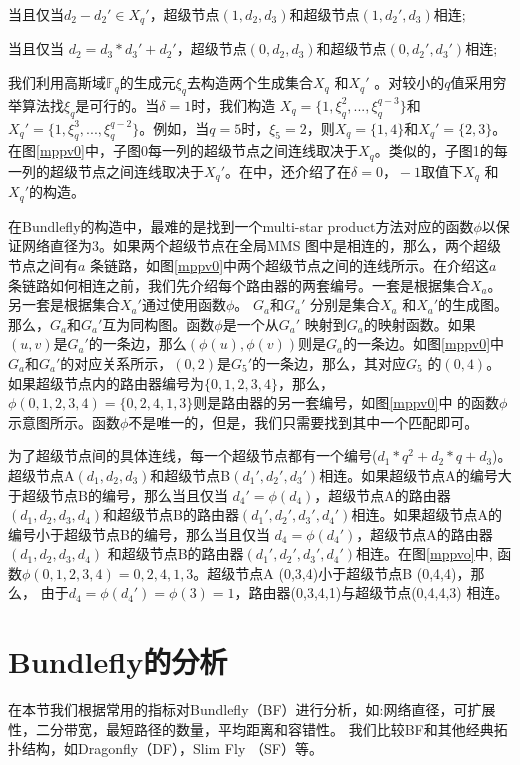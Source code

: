 当且仅当$d_{2}-d_{2}'\in X_{q}'$，超级节点$(1,d_{2},d_{3})$和超级节点$(1,d_{2}',d_{3})$相连;

当且仅当 $d_{2}=d_{3}*d_{3}'+d_{2}'$，超级节点$(0,d_{2},d_{3})$和超级节点$(0,d_{2}',d_{3}')$相连;

我们利用高斯域$\mathds{F}_{q}$的生成元$\xi_{q}$去构造两个生成集合$X_{q}$ 和$X_{q}'$ 。对较小的$q$值采用穷举算法找$\xi_{q}$是可行的。当$\delta=1$时，我们构造 $X_{q}=\{1,\xi_{q}^{2},...,\xi_{q}^{q-3}\}$和$X_{q}'=\{1,\xi_{q}^{3},...,\xi_{q}^{q-2}\}$。例如，当$q=5$时，$\xi_{5}=2$，则$X_{q}=\{1,4\}$和$X_{q}'=\{2,3\}$。在图\ref{mppv0}中，子图0每一列的超级节点之间连线取决于$X_{q}$。类似的，子图1的每一列的超级节点之间连线取决于$X_{q}'$。在中，还介绍了在$\delta=0，-1$取值下$X_{q}$ 和$X_{q}'$的构造。

在Bundlefly的构造中，最难的是找到一个multi-star product方法对应的函数$\phi$以保证网络直径为3。如果两个超级节点在全局MMS 图中是相连的，那么，两个超级节点之间有$a$ 条链路，如图\ref{mppv0}中两个超级节点之间的连线所示。在介绍这$a$ 条链路如何相连之前，我们先介绍每个路由器的两套编号。一套是根据集合$X_{a}$。 另一套是根据集合$X_{a}'$通过使用函数$\phi$。 $G_{a}$和$G_{a}'$ 分别是集合$X_{a}$ 和$X_{a}'$的生成图。那么，$G_{a}$和$G_{a}'$互为同构图。函数$\phi$是一个从$G_{a}'$ 映射到$G_{a}$的映射函数。如果$(u,v)$是$G_{a}'$的一条边，那么$(\phi(u),\phi(v))$则是$G_{a}$的一条边。如图\ref{mppv0}中$G_{a}$和$G_{a}'$的对应关系所示，$(0,2)$是$G_{5}'$的一条边，那么，其对应$G_{5}$ 的$(0,4)$。如果超级节点内的路由器编号为$\{0,1,2,3,4\}$，那么， $\phi(0,1,2,3,4)=\{0,2,4,1,3\}$则是路由器的另一套编号，如图\ref{mppv0}中
的函数$\phi$示意图所示。函数$\phi$不是唯一的，但是，我们只需要找到其中一个匹配即可。

为了超级节点间的具体连线，每一个超级节点都有一个编号($d_{1}*q^2+d_{2}*q+d_{3}$)。超级节点A$(d_{1},d_{2},d_{3})$和超级节点B$(d_{1}',d_{2}',d_{3}')$相连。如果超级节点A的编号大于超级节点B的编号，那么当且仅当 $d_{4}'=\phi(d_{4})$，超级节点A的路由器$(d_{1},d_{2},d_{3},d_{4})$和超级节点B的路由器$(d_{1}',d_{2}',d_{3}',d_{4}')$相连。如果超级节点A的编号小于超级节点B的编号，那么当且仅当 $d_{4}=\phi(d_{4}')$，超级节点A的路由器$(d_{1},d_{2},d_{3},d_{4})$ 和超级节点B的路由器$(d_{1}',d_{2}',d_{3}',d_{4}')$相连。在图\ref{mppvo}中,  函数$\phi(0,1,2,3,4)={0,2,4,1,3}$。超级节点A (0,3,4)小于超级节点B (0,4,4)，那么， 由于$d_{4}=\phi(d_{4}')=\phi(3)=1$，路由器(0,3,4,1)与超级节点(0,4,4,3) 相连。

\section{Bundlefly的分析}
在本节我们根据常用的指标对Bundlefly（BF）进行分析，如:网络直径，可扩展性，二分带宽，最短路径的数量，平均距离和容错性。
我们比较BF和其他经典拓扑结构，如Dragonfly（DF），Slim Fly （SF）等。


